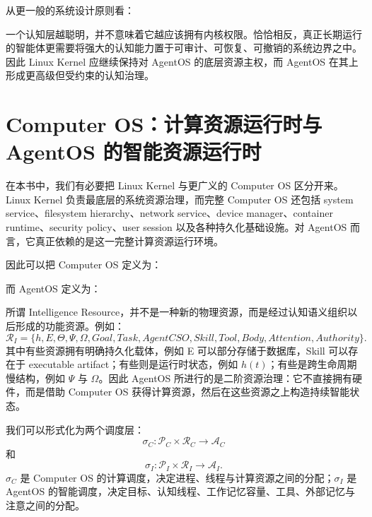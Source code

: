 从更一般的系统设计原则看：
\begin{statementbox}
\centering
{}
\end{statementbox}
一个认知层越聪明，并不意味着它越应该拥有内核权限。恰恰相反，真正长期运行的智能体更需要将强大的认知能力置于可审计、可恢复、可撤销的系统边界之中。因此 Linux Kernel 应继续保持对 AgentOS 的底层资源主权，而 AgentOS 在其上形成更高级但受约束的认知治理。

\section{Computer OS：计算资源运行时与 AgentOS 的智能资源运行时}

在本书中，我们有必要把 Linux Kernel 与更广义的 Computer OS 区分开来。Linux Kernel 负责最底层的系统资源治理，而完整 Computer OS 还包括 system service、filesystem hierarchy、network service、device manager、container runtime、security policy、user session 以及各种持久化基础设施。对 AgentOS 而言，它真正依赖的是这一完整计算资源运行环境。

因此可以把 Computer OS 定义为：
\begin{statementbox}
\centering
{}
\end{statementbox}
而 AgentOS 定义为：
\begin{statementbox}
\centering
{}
\end{statementbox}

所谓 Intelligence Resource，并不是一种新的物理资源，而是经过认知语义组织以后形成的功能资源。例如：
\[
\mathcal R_I
=
\{
h,E,\Theta,\Psi,\Omega,
Goal,
Task,
AgentCSO,
Skill,
Tool,
Body,
Attention,
Authority
\}.
\]
其中有些资源拥有明确持久化载体，例如 E 可以部分存储于数据库，Skill 可以存在于 executable artifact；有些则是运行时状态，例如 $h(t)$；有些是跨生命周期慢结构，例如 $\Psi$ 与 $\Omega$。因此 AgentOS 所进行的是二阶资源治理：它不直接拥有硬件，而是借助 Computer OS 获得计算资源，然后在这些资源之上构造持续智能状态。

我们可以形式化为两个调度层：
\[
\sigma_C:
\mathcal P_C\times\mathcal R_C
\rightarrow
\mathcal A_C
\]
和
\[
\sigma_I:
\mathcal P_I\times\mathcal R_I
\rightarrow
\mathcal A_I.
\]
$\sigma_C$ 是 Computer OS 的计算调度，决定进程、线程与计算资源之间的分配；$\sigma_I$ 是 AgentOS 的智能调度，决定目标、认知线程、工作记忆容量、工具、外部记忆与注意之间的分配。

